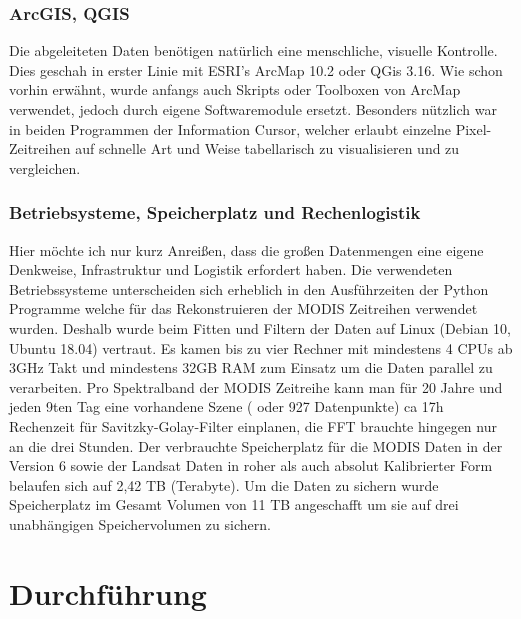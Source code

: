 \documentclass[11pt]{report}
\begin{document}
\subsection{ArcGIS, QGIS}
Die abgeleiteten Daten benötigen natürlich eine menschliche, visuelle Kontrolle. Dies geschah in erster Linie mit ESRI's ArcMap 10.2 oder QGis 3.16. Wie schon vorhin erwähnt, wurde anfangs auch Skripts oder Toolboxen von ArcMap verwendet, jedoch durch eigene Softwaremodule ersetzt. Besonders nützlich war in beiden Programmen der Information Cursor, welcher erlaubt einzelne Pixel-Zeitreihen auf schnelle Art und Weise tabellarisch zu visualisieren und zu vergleichen. 

\subsection{Betriebsysteme, Speicherplatz und Rechenlogistik}
Hier möchte ich nur kurz Anreißen, dass die großen Datenmengen eine eigene Denkweise, Infrastruktur und Logistik erfordert haben.
Die verwendeten Betriebssysteme unterscheiden sich erheblich in den Ausführzeiten der Python Programme welche für das Rekonstruieren der MODIS Zeitreihen verwendet wurden. Deshalb wurde beim Fitten und Filtern der Daten auf Linux (Debian 10, Ubuntu 18.04) vertraut. Es kamen bis zu vier Rechner mit mindestens 4 CPUs ab 3GHz Takt und mindestens 32GB RAM zum Einsatz um die Daten parallel zu verarbeiten. Pro Spektralband der MODIS Zeitreihe kann man für 20 Jahre und jeden 9ten Tag eine vorhandene Szene ( oder 927 Datenpunkte) ca 17h Rechenzeit für Savitzky-Golay-Filter einplanen, die FFT brauchte hingegen nur an die drei Stunden. Der verbrauchte Speicherplatz für die MODIS Daten in der Version 6 sowie der Landsat Daten in roher als auch absolut Kalibrierter Form belaufen sich auf 2,42 TB (Terabyte). Um die Daten zu sichern wurde Speicherplatz im Gesamt Volumen von 11 TB angeschafft um sie auf drei unabhängigen Speichervolumen zu sichern. 

\chapter{Durchführung}
\end{document}
